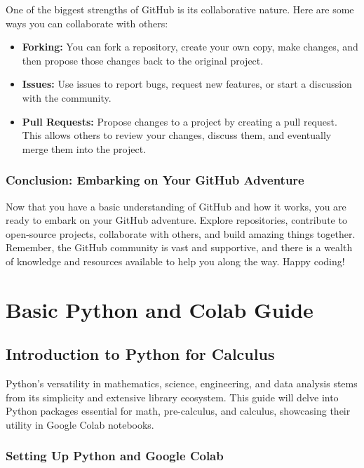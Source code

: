 \documentclass[a4paper,12pt]{book}
\begin{document}
One of the biggest strengths of GitHub is its collaborative nature. Here are some ways you can collaborate with others:

\begin{itemize}
    \item \textbf{Forking:} You can fork a repository, create your own copy, make changes, and then propose those changes back to the original project.
    \item \textbf{Issues:} Use issues to report bugs, request new features, or start a discussion with the community.
    \item \textbf{Pull Requests:} Propose changes to a project by creating a pull request. This allows others to review your changes, discuss them, and eventually merge them into the project.
\end{itemize}

\subsection*{Conclusion: Embarking on Your GitHub Adventure}

Now that you have a basic understanding of GitHub and how it works, you are ready to embark on your GitHub adventure. Explore repositories, contribute to open-source projects, collaborate with others, and build amazing things together. Remember, the GitHub community is vast and supportive, and there is a wealth of knowledge and resources available to help you along the way. Happy coding!

\chapter{Basic Python and Colab Guide}
\section*{Introduction to Python for Calculus}

Python's versatility in mathematics, science, engineering, and data analysis stems from its simplicity and extensive library ecosystem. This guide will delve into Python packages essential for math, pre-calculus, and calculus, showcasing their utility in Google Colab notebooks.

\subsection*{Setting Up Python and Google Colab}
\end{document}
